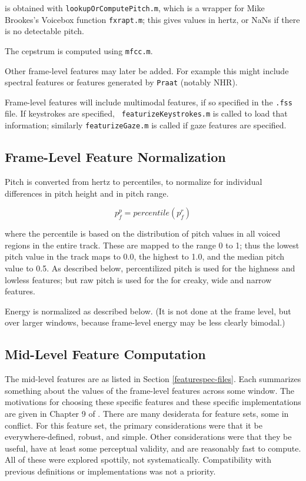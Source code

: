 \documentclass[11pt]{article}
\begin{document}
is obtained with {\tt lookupOrComputePitch.m}, which is a wrapper for
Mike Brookes's Voicebox function {\tt fxrapt.m}; this gives values in
hertz, or NaNs if there is no detectable pitch.

The cepstrum is computed using {\tt mfcc.m}.

Other frame-level features may later be added.  For example this might
include spectral features or features generated by {\tt Praat}
(notably NHR).

Frame-level features will include multimodal features, if so specified
in the {\tt .fss} file.  If keystrokes are specified, {\tt
  featurizeKeystrokes.m} is called to load that information; similarly
{\tt featurizeGaze.m} is called if gaze features are specified.

\subsection{Frame-Level Feature  Normalization}

Pitch is converted from hertz to percentiles, to normalize for
individual differences in pitch height and in pitch range.

\begin{equation}
p_f^p = percentile(p_f^r)
\end{equation}

where the percentile is based on the distribution of pitch values in
all voiced regions in the entire track.  These are mapped to the range
0 to 1; thus the lowest pitch value in the track maps to 0.0, the
highest to 1.0, and the median pitch value to 0.5.  As described
below, percentilized pitch is used for the highness and lowless
features; but raw pitch is used for the for creaky, wide and narrow
features.

Energy is normalized as described below. (It is not done at the frame
level, but over larger windows, because  frame-level
energy may be less clearly bimodal.)


\subsection{Mid-Level Feature Computation}   \label{other-features}

The mid-level features are as listed in Section
\ref{featurespec-files}.  Each summarizes something about the values
of the frame-level features across some window.  The motivations for
choosing these specific features and these specific implementations
are given in Chapter 9 of \cite{me-cup}.  There are many desiderata
for feature sets, some in conflict.  For this feature set, the primary
considerations were that it be everywhere-defined, robust, and simple.
Other considerations were that they be useful, have at least some
perceptual validity, and are reasonably fast to compute.  All of these
were explored spottily, not systematically.  Compatibility with
previous definitions or implementations was not a priority.
\end{document}
